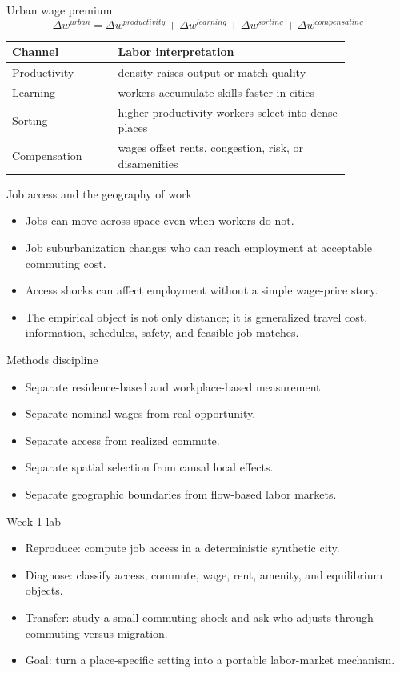 \documentclass[aspectratio=169,11pt]{beamer}
\begin{document}
\begin{frame}{Urban wage premium}
\[
\Delta w^{urban}
= \Delta w^{productivity}
+ \Delta w^{learning}
+ \Delta w^{sorting}
+ \Delta w^{compensating}
\]
\small
\begin{tabular}{p{0.26\linewidth} p{0.58\linewidth}}
\toprule
Channel & Labor interpretation \\
\midrule
Productivity & density raises output or match quality \\
Learning & workers accumulate skills faster in cities \\
Sorting & higher-productivity workers select into dense places \\
Compensation & wages offset rents, congestion, risk, or disamenities \\
\bottomrule
\end{tabular}
\end{frame}

\begin{frame}{Job access and the geography of work}
\begin{itemize}
    \item Jobs can move across space even when workers do not.
    \item Job suburbanization changes who can reach employment at acceptable commuting cost.
    \item Access shocks can affect employment without a simple wage-price story.
    \item The empirical object is not only distance; it is generalized travel cost, information, schedules, safety, and feasible job matches.
\end{itemize}
\end{frame}

\begin{frame}{Methods discipline}
\begin{itemize}
    \item Separate residence-based and workplace-based measurement.
    \item Separate nominal wages from real opportunity.
    \item Separate access from realized commute.
    \item Separate spatial selection from causal local effects.
    \item Separate geographic boundaries from flow-based labor markets.
\end{itemize}
\end{frame}

\begin{frame}{Week 1 lab}
\begin{itemize}
    \item Reproduce: compute job access in a deterministic synthetic city.
    \item Diagnose: classify access, commute, wage, rent, amenity, and equilibrium objects.
    \item Transfer: study a small commuting shock and ask who adjusts through commuting versus migration.
    \item Goal: turn a place-specific setting into a portable labor-market mechanism.
\end{itemize}
\end{frame}
\end{document}

